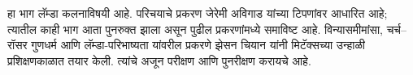 \documentclass[../../include/open-logic-part]{subfiles}
\begin{document}

\begin{editorial}
हा भाग लॅम्डा कलनाविषयी आहे. परिचयाचे प्रकरण जेरेमी अविगाड यांच्या
टिपणांवर आधारित आहे; त्यातील काही भाग आता पुनरुक्त झाला असून पुढील
प्रकरणांमध्ये समाविष्ट आहे. विन्यासमीमांसा, चर्च--रॉसर गुणधर्म आणि
लॅम्डा-परिभाष्यता यांवरील प्रकरणे झेसन चियान यांनी मिटॅक्सच्या उन्हाळी
प्रशिक्षणकाळात तयार केली. त्यांचे अजून परीक्षण आणि पुनरीक्षण करायचे आहे.
\end{editorial}





\OLEndPartHook
\end{document}
